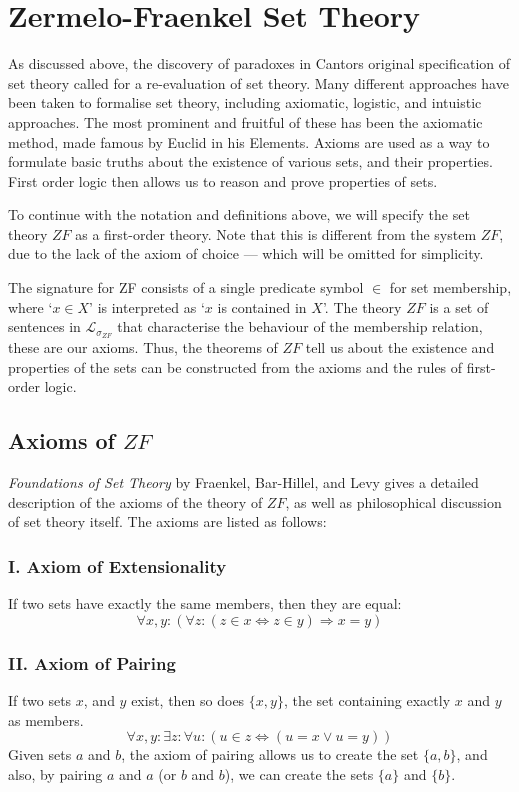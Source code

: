 \documentclass[11pt]{report}
\theoremstyle{definition}
\theoremstyle{theorem}
\theoremstyle{lemma}
\begin{document}
\section{Zermelo-Fraenkel Set Theory}
As discussed above, the discovery of paradoxes in Cantors original specification of set theory called for a re-evaluation of set theory.
Many different approaches have been taken to formalise set theory, including axiomatic, logistic, and intuistic approaches.
The most prominent and fruitful of these has been the axiomatic method, made famous by Euclid in his Elements.
Axioms are used as a way to formulate basic truths about the existence of various sets, and their properties.
First order logic then allows us to reason and prove properties of sets.

To continue with the notation and definitions above, we will specify the set theory $\mathit{ZF}$ as a first-order theory.
Note that this is different from the system $\mathit{ZF}$, due to the lack of the axiom of choice --- which will be omitted for simplicity.

The signature for ZF consists of a single predicate symbol $\in$ for set membership, where `$x \in X$' is interpreted as `$x$ is contained in $X$'.
The theory $\mathit{ZF}$ is a set of sentences in $\mathcal{L}_{\sigma_{\mathit{ZF}}}$ that characterise the behaviour of the membership relation, these are our axioms.
Thus, the theorems of $\mathit{ZF}$ tell us about the existence and properties of the sets can be constructed from the axioms and the rules of first-order logic.\\

\subsection{Axioms of $\mathit{ZF}$}
\textit{Foundations of Set Theory} by Fraenkel, Bar-Hillel, and Levy \cite{foundations} gives a detailed description of the axioms of the theory of $\mathit{ZF}$, as well as philosophical discussion of set theory itself.
The axioms are listed as follows:

\subsubsection*{I. Axiom of Extensionality}
If two sets have exactly the same members, then they are equal:
$$\forall x,y:(\forall z: (z\in x \Leftrightarrow z\in y) \Rightarrow x=y)$$

\subsubsection*{II. Axiom of Pairing}
If two sets $x$, and $y$ exist, then so does $\{x,y\}$, the set containing exactly $x$ and $y$ as members.
$$\forall x,y: \exists z: \forall u: (u\in z \Leftrightarrow (u=x \vee u=y))$$
Given sets $a$ and $b$, the axiom of pairing allows us to create the set $\{a,b\}$, and also, by pairing $a$ and $a$ (or $b$ and $b$), we can create the sets $\{a\}$ and $\{b\}$.
\end{document}
